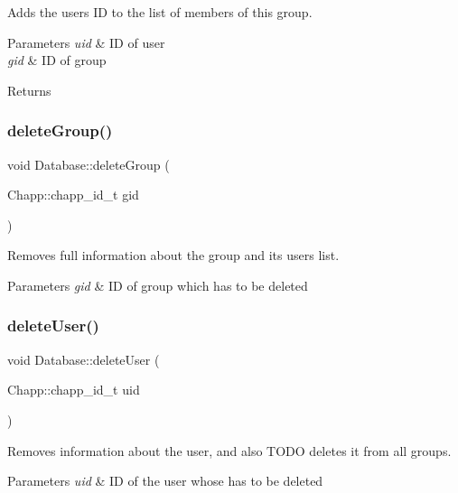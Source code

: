 Adds the user\textquotesingle{}s ID to the list of members of this group. 
\begin{DoxyParams}{Parameters}
{\em uid} & ID of user \\
\hline
{\em gid} & ID of group \\
\hline
\end{DoxyParams}
\begin{DoxyReturn}{Returns}

\end{DoxyReturn}
\mbox{\label{class_database_a680206c34e9a5ddebda18e05a3f82529}} 
\subsubsection{\texorpdfstring{delete\+Group()}{deleteGroup()}}
{\footnotesize\ttfamily void Database\+::delete\+Group (\begin{DoxyParamCaption}\item[{Chapp\+::chapp\+\_\+id\+\_\+t}]{gid }\end{DoxyParamCaption})}

Removes full information about the group and its users list. 
\begin{DoxyParams}{Parameters}
{\em gid} & ID of group which has to be deleted \\
\hline
\end{DoxyParams}
\mbox{\label{class_database_a1736f6c7fc8132b793568924e857bfe2}} 
\subsubsection{\texorpdfstring{delete\+User()}{deleteUser()}}
{\footnotesize\ttfamily void Database\+::delete\+User (\begin{DoxyParamCaption}\item[{Chapp\+::chapp\+\_\+id\+\_\+t}]{uid }\end{DoxyParamCaption})}

Removes information about the user, and also T\+O\+DO deletes it from all groups. 
\begin{DoxyParams}{Parameters}
{\em uid} & ID of the user whose has to be deleted \\
\hline
\end{DoxyParams}
\mbox{\label{class_database_a63af1a2a95bffd362f7d35746758d856}} 
